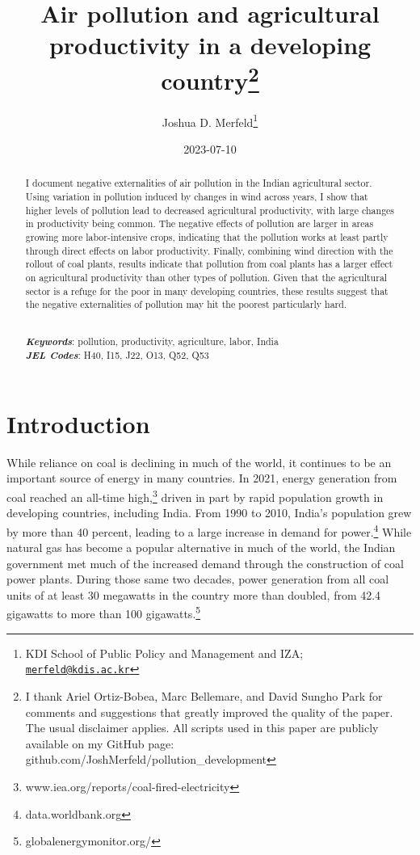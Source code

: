 \documentclass[
]{article}
\title{Air pollution and agricultural productivity in a developing country\footnote{I thank Ariel Ortiz-Bobea, Marc Bellemare, and David Sungho Park for comments and suggestions that greatly improved the quality of the paper. The usual disclaimer applies. All scripts used in this paper are publicly available on my GitHub page: github.com/JoshMerfeld/pollution\_development}}
\author{Joshua D. Merfeld\footnote{KDI School of Public Policy and Management and IZA; \href{mailto:merfeld@kdis.ac.kr}{\nolinkurl{merfeld@kdis.ac.kr}}}}
\date{2023-07-10}
\begin{document}
\maketitle
\begin{abstract}
\noindent I document negative externalities of air pollution in the Indian agricultural sector. Using variation in pollution induced by changes in wind across years, I show that higher levels of pollution lead to decreased agricultural productivity, with large changes in productivity being common. The negative effects of pollution are larger in areas growing more labor-intensive crops, indicating that the pollution works at least partly through direct effects on labor productivity. Finally, combining wind direction with the rollout of coal plants, results indicate that pollution from coal plants has a larger effect on agricultural productivity than other types of pollution. Given that the agricultural sector is a refuge for the poor in many developing countries, these results suggest that the negative externalities of pollution may hit the poorest particularly hard.\\
\strut \\
\textbf{\textit{Keywords}}: pollution, productivity, agriculture, labor, India\\
\textbf{\textit{JEL Codes}}: H40, I15, J22, O13, Q52, Q53
\end{abstract}

\newpage
\doublespacing

\hypertarget{introduction}{%
\section{Introduction}\label{introduction}}

While reliance on coal is declining in much of the world, it continues to be an important source of energy in many countries. In 2021, energy generation from coal reached an all-time high,\footnote{www.iea.org/reports/coal-fired-electricity} driven in part by rapid population growth in developing countries, including India. From 1990 to 2010, India's population grew by more than 40 percent, leading to a large increase in demand for power.\footnote{data.worldbank.org} While natural gas has become a popular alternative in much of the world, the Indian government met much of the increased demand through the construction of coal power plants. During those same two decades, power generation from all coal units of at least 30 megawatts in the country more than doubled, from 42.4 gigawatts to more than 100 gigawatts.\footnote{globalenergymonitor.org/}
\end{document}
